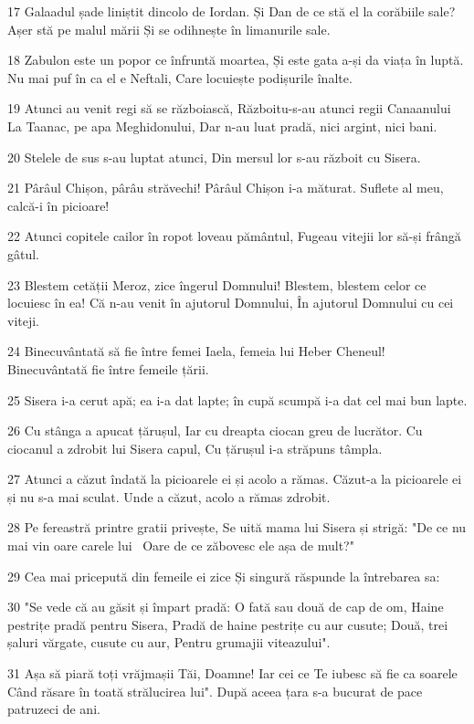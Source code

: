\par 17 Galaadul șade liniștit dincolo de Iordan. Și Dan de ce stă el la corăbiile sale? Așer stă pe malul mării Și se odihnește în limanurile sale.
\par 18 Zabulon este un popor ce înfruntă moartea, Și este gata a-și da viața în luptă. Nu mai puf în ca el e Neftali, Care locuiește podișurile înalte.
\par 19 Atunci au venit regi să se războiască, Războitu-s-au atunci regii Canaanului La Taanac, pe apa Meghidonului, Dar n-au luat pradă, nici argint, nici bani.
\par 20 Stelele de sus s-au luptat atunci, Din mersul lor s-au războit cu Sisera.
\par 21 Pârâul Chișon, pârâu străvechi! Pârâul Chișon i-a măturat. Suflete al meu, calcă-i în picioare!
\par 22 Atunci copitele cailor în ropot loveau pământul, Fugeau vitejii lor să-și frângă gâtul.
\par 23 Blestem cetății Meroz, zice îngerul Domnului! Blestem, blestem celor ce locuiesc în ea! Că n-au venit în ajutorul Domnului, În ajutorul Domnului cu cei viteji.
\par 24 Binecuvântată să fie între femei Iaela, femeia lui Heber Cheneul! Binecuvântată fie între femeile țării.
\par 25 Sisera i-a cerut apă; ea i-a dat lapte; în cupă scumpă i-a dat cel mai bun lapte.
\par 26 Cu stânga a apucat țărușul, Iar cu dreapta ciocan greu de lucrător. Cu ciocanul a zdrobit lui Sisera capul, Cu țărușul i-a străpuns tâmpla.
\par 27 Atunci a căzut îndată la picioarele ei și acolo a rămas. Căzut-a la picioarele ei și nu s-a mai sculat. Unde a căzut, acolo a rămas zdrobit.
\par 28 Pe fereastră printre gratii privește, Se uită mama lui Sisera și strigă: "De ce nu mai vin oare carele lui  Oare de ce zăbovesc ele așa de mult?"
\par 29 Cea mai pricepută din femeile ei zice Și singură răspunde la întrebarea sa:
\par 30 "Se vede că au găsit și împart pradă: O fată sau două de cap de om, Haine pestrițe pradă pentru Sisera, Pradă de haine pestrițe cu aur cusute; Două, trei șaluri vărgate, cusute cu aur, Pentru grumajii viteazului".
\par 31 Așa să piară toți vrăjmașii Tăi, Doamne! Iar cei ce Te iubesc să fie ca soarele Când răsare în toată strălucirea lui". După aceea țara s-a bucurat de pace patruzeci de ani.

